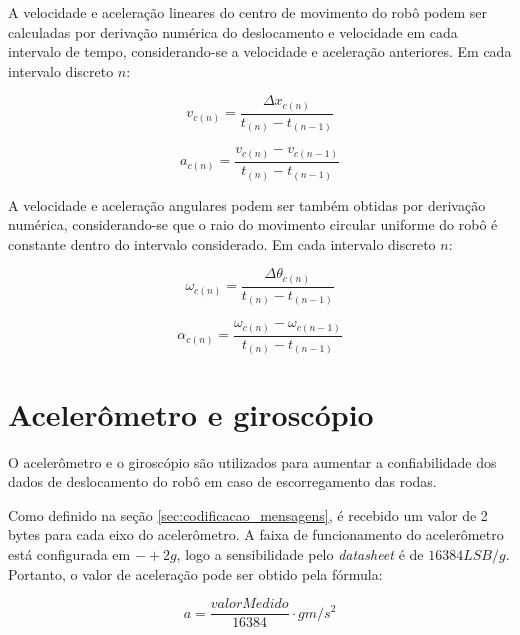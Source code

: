A velocidade e aceleração lineares do centro de movimento do robô podem ser calculadas por derivação numérica do deslocamento e velocidade em cada intervalo de tempo, considerando-se a velocidade e aceleração anteriores. Em cada intervalo discreto $n$:

\begin{equation}
  v_{c (n)} = \frac{\Delta x_{c (n)} }{t_{(n)} - t_{(n-1)}}
  \label{eq:velocidade}
\end{equation}

\begin{equation}
  a_{c (n)} = \frac{v_{c (n)} - v_{c (n-1)}}{t_{(n)} - t_{(n-1)}}
  \label{eq:velocidade}
\end{equation}


A velocidade e aceleração angulares podem ser também obtidas por derivação numérica, considerando-se que o raio do movimento circular uniforme do robô é constante dentro do intervalo considerado. Em cada intervalo discreto $n$:

\begin{equation}
  \omega_{c (n)} = \frac{\Delta \theta_{c (n)} }{t_{(n)} - t_{(n-1)}}
  \label{eq:velocidade}
\end{equation}

\begin{equation}
  \alpha_{c (n)} = \frac{\omega_{c (n)} - \omega_{c (n-1)}}{t_{(n)} - t_{(n-1)}}
  \label{eq:velocidade}
\end{equation}


\section{Acelerômetro e giroscópio}
\label{sec:teoria_acel_giro}

O acelerômetro e o giroscópio são utilizados para aumentar a confiabilidade dos dados de deslocamento do robô em caso de escorregamento das rodas.



Como definido na seção \ref{sec:codificacao_mensagens}, é recebido um valor de 2 bytes para cada eixo do acelerômetro. A faixa de funcionamento do acelerômetro está configurada em $-+2g$, logo a sensibilidade pelo \textit{datasheet} é de $16384 LSB/g$. Portanto, o valor de aceleração pode ser obtido pela fórmula:

\begin{equation}
  a = \frac{valorMedido}{16384} \cdot g \unit{m/s^2}
  \label{eq:acel}
\end{equation}

